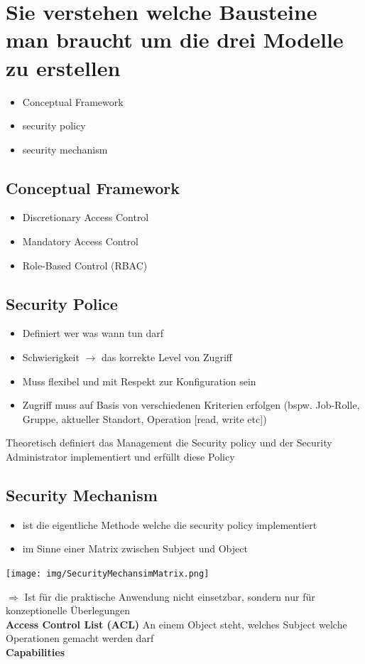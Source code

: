 \documentclass{report}
\newenvironment{Figure}
	{\par\medskip\noindent\minipage{\linewidth}}
	{\endminipage\par\medskip}
\theoremstyle{definition}
\theoremstyle{example}
\begin{document}
\section{Sie verstehen welche Bausteine man braucht um die drei Modelle zu erstellen}
\begin{itemize}
	\item Conceptual Framework
	\item security policy
	\item security mechanism
\end{itemize}

	\subsection{Conceptual Framework}
\begin{itemize}
	\item Discretionary Access Control
	\item Mandatory Access Control
	\item Role-Based Control (RBAC)
\end{itemize}

	\subsection{Security Police}
\begin{itemize}
	\item Definiert wer was wann tun darf
	\item Schwierigkeit $\rightarrow$ das korrekte Level von Zugriff
	\item Muss flexibel und mit Respekt zur Konfiguration sein
	\item Zugriff muss auf Basis von verschiedenen Kriterien erfolgen (bspw. Job-Rolle, Gruppe, aktueller Standort, Operation [read, write etc])
\end{itemize}
Theoretisch definiert das Management die Security policy und der Security Administrator implementiert und erfüllt diese Policy

	\subsection{Security Mechanism}
\begin{itemize}
	\item ist die eigentliche Methode welche die security policy implementiert
	\item im Sinne einer Matrix zwischen Subject und Object
\end{itemize}
\begin{Figure}
\centering
\texttt{[image: img/SecurityMechansimMatrix.png]}
	\label{fig:Abbildung einer Beispielmatrix des Security Mechanismus}
\end{Figure}
$\Rightarrow$ Ist für die praktische Anwendung nicht einsetzbar, sondern nur für konzeptionelle Überlegungen\\
\textbf{Access Control List (ACL)} An einem Object steht, welches Subject welche Operationen gemacht werden darf \\
\textbf{Capabilities} 
\end{document}
